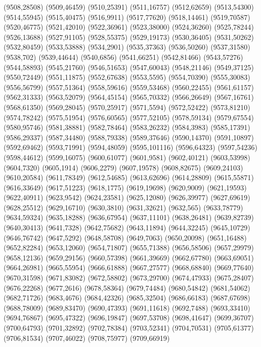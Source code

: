 (9508,28508)
(9509,46459)
(9510,25391)
(9511,16757)
(9512,62659)
(9513,54300)
(9514,55945)
(9515,40475)
(9516,9911)
(9517,77620)
(9518,14461)
(9519,70587)
(9520,46775)
(9521,42010)
(9522,36961)
(9523,38000)
(9524,36260)
(9525,78244)
(9526,13688)
(9527,91105)
(9528,55375)
(9529,19173)
(9530,36405)
(9531,50262)
(9532,80459)
(9533,53888)
(9534,2901)
(9535,37363)
(9536,50260)
(9537,31580)
(9538,702)
(9539,44644)
(9540,6856)
(9541,66251)
(9542,81466)
(9543,57276)
(9544,58893)
(9545,21760)
(9546,51653)
(9547,60043)
(9548,21146)
(9549,37125)
(9550,72449)
(9551,11875)
(9552,67638)
(9553,5595)
(9554,70390)
(9555,30083)
(9556,56799)
(9557,51364)
(9558,59616)
(9559,53468)
(9560,22455)
(9561,61157)
(9562,31333)
(9563,52079)
(9564,45154)
(9565,70332)
(9566,26649)
(9567,16761)
(9568,61350)
(9569,28045)
(9570,25917)
(9571,5594)
(9572,52422)
(9573,81210)
(9574,78242)
(9575,51954)
(9576,60565)
(9577,52105)
(9578,59134)
(9579,67554)
(9580,95746)
(9581,38881)
(9582,78464)
(9583,26232)
(9584,3983)
(9585,17391)
(9586,29337)
(9587,34480)
(9588,79338)
(9589,37646)
(9590,14370)
(9591,10897)
(9592,69462)
(9593,71991)
(9594,48059)
(9595,101116)
(9596,64323)
(9597,54236)
(9598,44612)
(9599,16075)
(9600,61077)
(9601,9581)
(9602,40121)
(9603,53998)
(9604,7320)
(9605,1914)
(9606,2279)
(9607,19578)
(9608,82675)
(9609,24103)
(9610,20584)
(9611,78349)
(9612,54685)
(9613,62696)
(9614,28809)
(9615,55871)
(9616,33649)
(9617,51223)
(9618,1775)
(9619,19698)
(9620,9009)
(9621,19593)
(9622,40911)
(9623,9542)
(9624,23581)
(9625,12080)
(9626,39977)
(9627,69619)
(9628,25512)
(9629,16710)
(9630,3810)
(9631,32621)
(9632,565)
(9633,78779)
(9634,59324)
(9635,18288)
(9636,67954)
(9637,11101)
(9638,26481)
(9639,82739)
(9640,30413)
(9641,7328)
(9642,75682)
(9643,11894)
(9644,32245)
(9645,10729)
(9646,76742)
(9647,5292)
(9648,58708)
(9649,7063)
(9650,20098)
(9651,16488)
(9652,82284)
(9653,12060)
(9654,71807)
(9655,71388)
(9656,58506)
(9657,29979)
(9658,12136)
(9659,29156)
(9660,57398)
(9661,39669)
(9662,67780)
(9663,69051)
(9664,26981)
(9665,55954)
(9666,61888)
(9667,27577)
(9668,68840)
(9669,77640)
(9670,31598)
(9671,83082)
(9672,58802)
(9673,29700)
(9674,47933)
(9675,28407)
(9676,22268)
(9677,2616)
(9678,58364)
(9679,74484)
(9680,54842)
(9681,54062)
(9682,71726)
(9683,4676)
(9684,42326)
(9685,32504)
(9686,66183)
(9687,67698)
(9688,78009)
(9689,83470)
(9690,47393)
(9691,11618)
(9692,7488)
(9693,33410)
(9694,76867)
(9695,47322)
(9696,19847)
(9697,53708)
(9698,41647)
(9699,36707)
(9700,64793)
(9701,32892)
(9702,78384)
(9703,52341)
(9704,70531)
(9705,61377)
(9706,81534)
(9707,46022)
(9708,75977)
(9709,66919)
